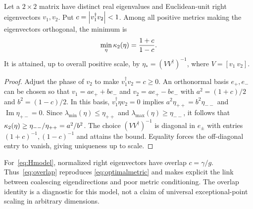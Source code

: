\begin{proposition}
\label{prop:overlap}
Let a $2\times2$ matrix have distinct real eigenvalues and Euclidean-unit
right eigenvectors $v_1,v_2$. Put $c=\left\lvert v_1^\dagger v_2\right\rvert<1$.
Among all positive metrics making the eigenvectors orthogonal, the minimum is
\begin{equation}\label{eq:overlap}
 \min_\eta\kappa_2(\eta)=\frac{1+c}{1-c}.
\end{equation}
It is attained, up to overall positive scale, by
$\eta_*=(VV^\dagger)^{-1}$, where $V=[v_1\ v_2]$.
\end{proposition}
\begin{proof}
Adjust the phase of $v_2$ to make $v_1^\dagger v_2=c\geq0$.
An orthonormal basis $e_+,e_-$ can be chosen so that
$v_1=a e_++b e_-$ and $v_2=a e_+-b e_-$ with
$a^2=(1+c)/2$ and $b^2=(1-c)/2$.
In this basis, $v_1^\dagger\eta v_2=0$ implies
$a^2\eta_{++}=b^2\eta_{--}$ and
$\operatorname{Im}\eta_{+-}=0$.
Since $\lambda_{\min}(\eta)\leq\eta_{++}$ and
$\lambda_{\max}(\eta)\geq\eta_{--}$, it follows that
$\kappa_2(\eta)\geq\eta_{--}/\eta_{++}=a^2/b^2$.
The choice $(VV^\dagger)^{-1}$ is diagonal in $e_\pm$ with
entries $(1+c)^{-1},(1-c)^{-1}$ and attains the bound.
Equality forces the off-diagonal entry to vanish, giving uniqueness up to scale.
\end{proof}

For~\eqref{eq:Hmodel}, normalized right eigenvectors have overlap
$c=\gamma/g$. Thus~\eqref{eq:overlap} reproduces
\eqref{eq:optimalmetric} and makes explicit the link between
coalescing eigendirections and poor metric conditioning. The overlap
identity is a diagnostic for this model, not a claim of universal
exceptional-point scaling in arbitrary dimensions.
